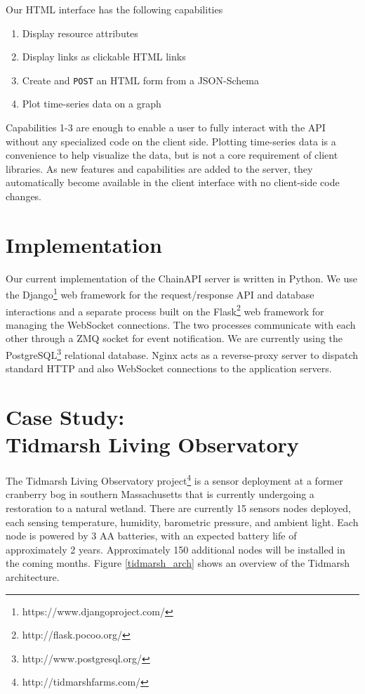 \documentclass{acm_proc_article-sp}
\newenvironment{tightenumerate}{
    \vspace{-10pt}
    \begin{enumerate}
        \setlength{\parskip}{-1pt}}{
    \end{enumerate}
    \vspace{-10pt}}
\begin{document}
Our HTML interface has the following capabilities

\begin{tightenumerate}
    \item Display resource attributes
    \item Display links as clickable HTML links
    \item Create and \texttt{POST} an HTML form from a JSON-Schema
    \item Plot time-series data on a graph
\end{tightenumerate}

Capabilities 1-3 are enough to enable a user to fully interact with the API
without any specialized code on the client side. Plotting time-series data is a
convenience to help visualize the data, but is not a core requirement of client
libraries. As new features and capabilities are added to the server, they
automatically become available in the client interface with no client-side code
changes.

\section{Implementation}

Our current implementation of the ChainAPI server is written in Python. We use
the Django\footnote{https://www.djangoproject.com/} web framework for the
request/response API and database interactions and a separate process built on
the Flask\footnote{http://flask.pocoo.org/} web framework for managing the
WebSocket connections. The two processes communicate with each other through a
ZMQ socket for event notification. We are currently using the
PostgreSQL\footnote{http://www.postgresql.org/} relational database. Nginx acts
as a reverse-proxy server to dispatch standard HTTP and also WebSocket
connections to the application servers.


\section{Case Study:\\Tidmarsh Living Observatory}

The Tidmarsh Living Observatory project\footnote{http://tidmarshfarms.com/} is
a sensor deployment at a former cranberry bog in southern Massachusetts that is
currently undergoing a restoration to a natural wetland. There are currently 15
sensors nodes deployed, each sensing temperature, humidity, barometric
pressure, and ambient light. Each node is powered by 3 AA batteries, with an
expected battery life of approximately 2 years. Approximately 150 additional
nodes will be installed in the coming months. Figure \ref{tidmarsh_arch} shows
an overview of the Tidmarsh architecture.
\end{document}
